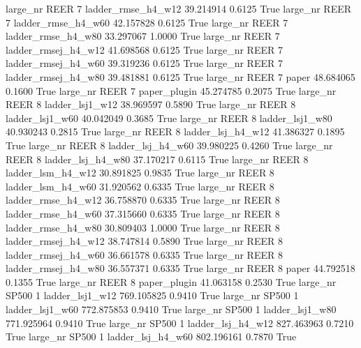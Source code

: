   large_nr     REER                 7  ladder_rmse_h4_w12   39.214914      0.6125    True
  large_nr     REER                 7  ladder_rmse_h4_w60   42.157828      0.6125    True
  large_nr     REER                 7  ladder_rmse_h4_w80   33.297067      1.0000    True
  large_nr     REER                 7 ladder_rmsej_h4_w12   41.698568      0.6125    True
  large_nr     REER                 7 ladder_rmsej_h4_w60   39.319236      0.6125    True
  large_nr     REER                 7 ladder_rmsej_h4_w80   39.481881      0.6125    True
  large_nr     REER                 7               paper   48.684065      0.1600    True
  large_nr     REER                 7        paper_plugin   45.274785      0.2075    True
  large_nr     REER                 8     ladder_lsj1_w12   38.969597      0.5890    True
  large_nr     REER                 8     ladder_lsj1_w60   40.042049      0.3685    True
  large_nr     REER                 8     ladder_lsj1_w80   40.930243      0.2815    True
  large_nr     REER                 8   ladder_lsj_h4_w12   41.386327      0.1895    True
  large_nr     REER                 8   ladder_lsj_h4_w60   39.980225      0.4260    True
  large_nr     REER                 8   ladder_lsj_h4_w80   37.170217      0.6115    True
  large_nr     REER                 8   ladder_lsm_h4_w12   30.891825      0.9835    True
  large_nr     REER                 8   ladder_lsm_h4_w60   31.920562      0.6335    True
  large_nr     REER                 8  ladder_rmse_h4_w12   36.758870      0.6335    True
  large_nr     REER                 8  ladder_rmse_h4_w60   37.315660      0.6335    True
  large_nr     REER                 8  ladder_rmse_h4_w80   30.809403      1.0000    True
  large_nr     REER                 8 ladder_rmsej_h4_w12   38.747814      0.5890    True
  large_nr     REER                 8 ladder_rmsej_h4_w60   36.661578      0.6335    True
  large_nr     REER                 8 ladder_rmsej_h4_w80   36.557371      0.6335    True
  large_nr     REER                 8               paper   44.792518      0.1355    True
  large_nr     REER                 8        paper_plugin   41.063158      0.2530    True
  large_nr    SP500                 1     ladder_lsj1_w12  769.105825      0.9410    True
  large_nr    SP500                 1     ladder_lsj1_w60  772.875853      0.9410    True
  large_nr    SP500                 1     ladder_lsj1_w80  771.925964      0.9410    True
  large_nr    SP500                 1   ladder_lsj_h4_w12  827.463963      0.7210    True
  large_nr    SP500                 1   ladder_lsj_h4_w60  802.196161      0.7870    True
